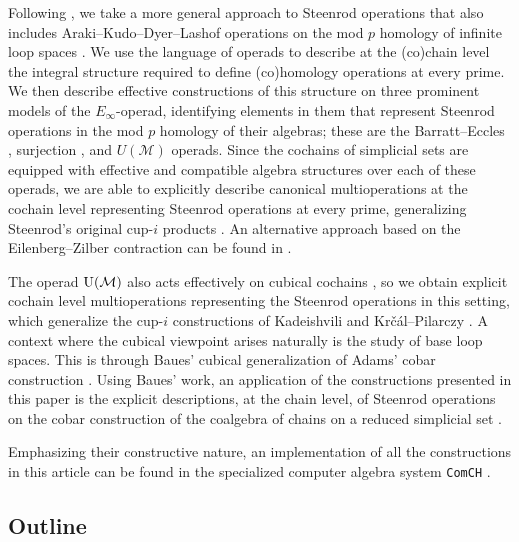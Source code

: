Following \cite{may1970general}, we take a more general approach to Steenrod operations that also includes Araki--Kudo--Dyer--Lashof operations on the mod $p$ homology of infinite loop spaces \cite{araki56squaring, dyer62lashof}.
We use the language of operads \cite{may1972geometry} to describe at the (co)chain level the integral structure required to define (co)homology operations at every prime.
We then describe effective constructions of this structure on three prominent models of the $E_\infty$-operad, identifying elements in them that represent Steenrod operations in the mod $p$ homology of their algebras; these are the Barratt--Eccles \cite{berger2004combinatorial}, surjection \cite{mcclure2003multivariable}, and $U(\mathcal M)$ \cite{medina2020prop1} operads.
Since the cochains of simplicial sets are equipped with effective and compatible algebra structures over each of these operads, we are able to explicitly describe canonical multioperations at the cochain level representing Steenrod operations at every prime, generalizing Steenrod's original cup-$i$ products \cite{steenrod1947products}.
An alternative approach based on the Eilenberg--Zilber contraction can be found in \cite{gonzalez2005cocyclic}.

The operad ${\operatorname{U}(\mathcal{M})}$ also acts effectively on cubical cochains \cite{medina2021cubical}, so we obtain explicit cochain level multioperations representing the Steenrod operations in this setting, which generalize the cup-$i$ constructions of Kadeishvili \cite{kadeishvili2003cupi} and Kr\v{c}\'{a}l--Pilarczy \cite{pilarczyk2016cubical}.
A context where the cubical viewpoint arises naturally is the study of base loop spaces.
This is through Baues' cubical generalization of Adams' cobar construction \cite{adams1956cobar, baues1998hopf}.
Using Baues' work, an application of the constructions presented in this paper is the explicit descriptions, at the chain level, of Steenrod operations on the cobar construction of the coalgebra of chains on a reduced simplicial set \cite{medina2021cobar}.

Emphasizing their constructive nature, an implementation of all the constructions in this article can be found in the specialized computer algebra system \texttt{ComCH} \cite{medina2021computer}.

\subsection*{Outline}

